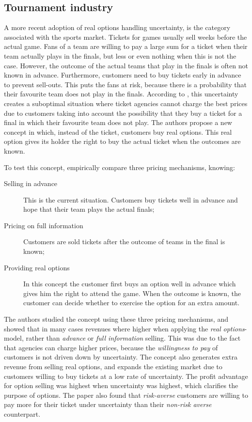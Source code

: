 \subsection{Tournament industry}
A more recent adoption of real options handling uncertainty, is the category associated with the sports market. Tickets for games usually sell weeks before the actual game. Fans of a team are willing to pay a large sum for a ticket when their team actually plays in the finals, but less or even nothing when this is not the case. However, the outcome of the actual teams that play in the finals is often not known in advance. Furthermore, customers need to buy tickets early in advance to prevent sell-outs. This puts the fans at risk, because there is a probability that their favourite team does not play in the finals. According to , this uncertainty creates a suboptimal situation where ticket agencies cannot charge the best prices due to customers taking into account the possibility that they buy a ticket for a final in which their favourite team does not play. The authors propose a new concept in which, instead of the ticket, customers buy real options. This real option gives its holder the right to buy the actual ticket when the outcomes are known.

To test this concept,  empirically compare three pricing mechanisms, knowing:
\begin{description}
\item[Selling in advance] This is the current situation. Customers buy tickets well in advance and hope that their team plays the actual finals;
\item[Pricing on full information] Customers are sold tickets after the outcome of teams in the final is known;
\item[Providing real options] In this concept the customer first buys an option well in advance which gives him the right to attend the game. When the outcome is known, the customer can decide whether to exercise the option for an extra amount.
\end{description}

The authors studied the concept using these three pricing mechanisms, and showed that in many cases revenues where higher when applying the \emph{real options}-model, rather than \emph{advance} or \emph{full information} selling.  This was due to the fact that agencies can charge higher prices, because the \emph{willingness to pay} of customers is not driven down by uncertainty. The concept also generates extra revenue from selling real options, and expands the existing market due to customers willing to buy tickets at a low rate of uncertainty. The profit advantage for option selling was highest when uncertainty was highest, which clarifies the purpose of options. The paper also found that \emph{risk-averse} customers are willing to pay more for their ticket under uncertainty than their \emph{non-risk averse} counterpart.

